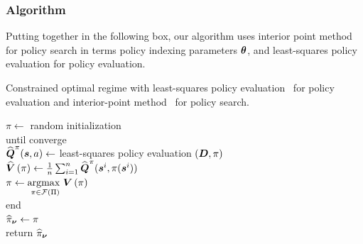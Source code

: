 \subsubsection{Algorithm}
Putting together in the following box, our algorithm uses interior point method for policy search in terms policy indexing parameters $\boldsymbol{\theta}$, and least-squares policy evaluation for policy evaluation.\\
\begin{algorithm}[H]
	\caption{Constrained optimal regime with least-squares policy evaluation~\cite{Lagoudakis2003,Lagoudakis2001} for policy evaluation and interior-point method~\cite{Waltz2006,Byrd1999} for policy search.}
	\BlankLine
	\BlankLine
	$\pi \leftarrow$  random initialization\\
	until converge\\
	\hspace{25pt} $\widehat{\boldsymbol{Q}}^{\pi}(\boldsymbol{s}, a) \leftarrow$ least-squares policy evaluation $\left(\boldsymbol{D}, \pi \right)$\\
	\hspace{25pt} $\widehat{\boldsymbol{V}}\left(\pi\right) \leftarrow \frac{1}{n}\sum_{i=1}^n\widehat{\boldsymbol{Q}}^{\pi}(\boldsymbol{s}^i, \pi(\boldsymbol{s}^i))$\\
	\hspace{25pt} $\pi \leftarrow \underset{\pi \in \mathcal{F}(\Pi)}{\text{argmax }}	\boldsymbol{V}\left({\pi}\right)$\\
	end\\
	$\widehat{\pi}_{\boldsymbol{\nu}} \leftarrow \pi$\\ 
	return $\widehat{\pi}_{\boldsymbol{\nu}} $
\end{algorithm} 
